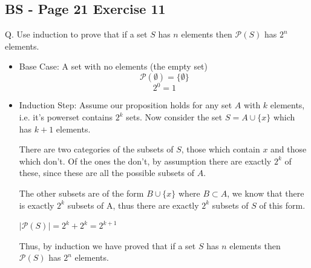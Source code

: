 \documentclass{article}
\begin{document}
\subsection*{BS - Page 21 Exercise 11}
Q. Use induction to prove that if a set \(S\) has \(n\) elements then \(\mathcal{P}(S)\) has \(2^n\) elements.

\begin{itemize}
    \item Base Case: A set with no elements (the empty set)
\[
\mathcal{P}(\emptyset) = \{\emptyset\}
\]
\[
2^0 = 1
\]

    \item Induction Step: Assume our proposition holds for any set \(A\) with \(k\) elements, i.e. it's powerset contains \(2^k\) sets.
Now consider the set \( S = A \cup \{x\}\) which has \(k+1\) elements. 

There are two categories of the subsets of \(S\), those which contain \(x\) and
those which don't. Of the ones the don't, by assumption there are exactly \(2^k\) of these, since these are all the possible subsets of \(A\). 

The other subsets are of the form \(B \cup \{x\}\) where 
\(B \subset A\), we know that there is exactly \(2^k\) subsets of A, thus there are exactly \(2^k\) subsets of \(S\) of this form. 

\(|\mathcal{P}(S)| = 2^k + 2^k = 2^{k+1}\)

Thus, by induction we have proved that  if a set \(S\) has \(n\) elements then \(\mathcal{P}(S)\) has \(2^n\) elements.

\end{itemize}
\end{document}
